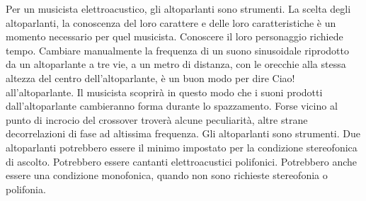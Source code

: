 Per un musicista elettroacustico, gli altoparlanti sono strumenti. La scelta
degli altoparlanti, la conoscenza del loro carattere e delle loro
caratteristiche è un momento necessario per quel musicista. Conoscere il loro
personaggio richiede tempo. Cambiare manualmente la frequenza di un suono
sinusoidale riprodotto da un altoparlante a tre vie, a un metro di distanza,
con le orecchie alla stessa altezza del centro dell'altoparlante, è un buon modo
per dire Ciao! all'altoparlante. Il musicista scoprirà in questo modo che i
suoni prodotti dall'altoparlante cambieranno forma durante lo spazzamento. Forse
vicino al punto di incrocio del crossover troverà alcune peculiarità, altre
strane decorrelazioni di fase ad altissima frequenza. Gli altoparlanti sono
strumenti. Due altoparlanti potrebbero essere il minimo impostato per la
condizione stereofonica di ascolto. Potrebbero essere cantanti elettroacustici
polifonici. Potrebbero anche essere una condizione monofonica, quando non sono
richieste stereofonia o polifonia.%
